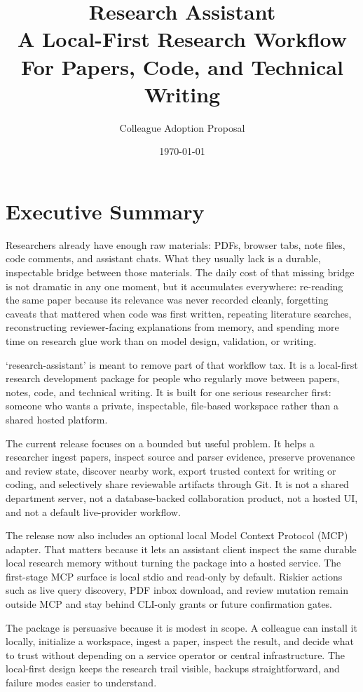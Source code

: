 \documentclass[11pt,a4paper,openany]{book}
\title{\Huge\textbf{Research Assistant}\\[8pt]
\Large A Local-First Research Workflow For Papers, Code, and Technical Writing}
\author{Colleague Adoption Proposal}
\date{\today}
\begin{document}
\frontmatter
\maketitle
\tableofcontents
\mainmatter

\chapter{Executive Summary}

Researchers already have enough raw materials: PDFs, browser tabs, note files,
code comments, and assistant chats. What they usually lack is a durable,
inspectable bridge between those materials. The daily cost of that missing bridge
is not dramatic in any one moment, but it accumulates everywhere: re-reading the
same paper because its relevance was never recorded cleanly, forgetting caveats
that mattered when code was first written, repeating literature searches,
reconstructing reviewer-facing explanations from memory, and spending more time
on research glue work than on model design, validation, or writing.

`research-assistant' is meant to remove part of that workflow tax. It is a
local-first research development package for people who regularly move between
papers, notes, code, and technical writing. It is built for one serious
researcher first: someone who wants a private, inspectable, file-based workspace
rather than a shared hosted platform.

The current release focuses on a bounded but useful problem. It helps a
researcher ingest papers, inspect source and parser evidence, preserve
provenance and review state, discover nearby work, export trusted context for
writing or coding, and selectively share reviewable artifacts through Git. It is
not a shared department server, not a database-backed collaboration product, not
a hosted UI, and not a default live-provider workflow.

The release now also includes an optional local Model Context Protocol (MCP)
adapter. That matters because it lets an assistant client inspect the same
durable local research memory without turning the package into a hosted service.
The first-stage MCP surface is local stdio and read-only by default. Riskier
actions such as live query discovery, PDF inbox download, and review mutation
remain outside MCP and stay behind CLI-only grants or future confirmation gates.

The package is persuasive because it is modest in scope. A colleague can install
it locally, initialize a workspace, ingest a paper, inspect the result, and
decide what to trust without depending on a service operator or central
infrastructure. The local-first design keeps the research trail visible, backups
straightforward, and failure modes easier to understand.
\end{document}
